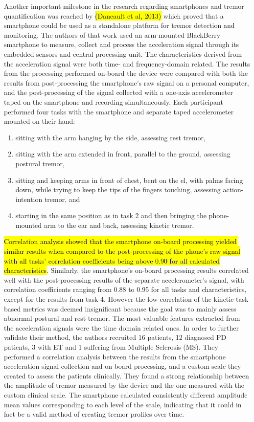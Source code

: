Another important milestone in the research regarding smartphones and tremor quantification was reached by \hl{(Daneault et al, 2013)} which proved that a smartphone could be used as a standalone platform for tremor detection and monitoring. The authors of that work used an arm-mounted BlackBerry smartphone to measure, collect and process the acceleration signal through its embedded sensors and central processing unit. The characteristics derived from the acceleration signal were both time- and frequency-domain related. The results from the processing performed on-board the device were compared with both the results from post-processing the smartphone's raw signal on a personal computer, and the post-processing of the signal collected with a one-axis accelerometer taped on the smartphone and recording simultaneously. Each participant performed four tasks with the smartphone and separate taped accelerometer mounted on their hand:

\begin{enumerate}
\item sitting with the arm hanging by the side, assessing rest tremor,
\item sitting with the arm extended in front, parallel to the ground, assessing postural tremor,
\item sitting and keeping arms in front of chest, bent on the el, with palms facing down, while trying to keep the tips of the fingers touching, assessing action-intention tremor, and 
\item starting in the same position as in task 2 and then bringing the phone-mounted arm to the ear and back, assessing kinetic tremor. 
\end{enumerate}

\hl{Correlation analysis showed that the smartphone on-board processing yielded similar results when compared to the post-processing of the phone's raw signal with all tasks' correlation coefficients being above 0.90 for all calculated characteristics}. Similarly, the smartphone's on-board processing results correlated well with the post-processing results of the separate accelerometer's signal, with correlation coefficients ranging from 0.88 to 0.95 for all tasks and characteristics, except for the results from task 4. However the low correlation of the kinetic task based metrics was deemed insignificant because the goal was to mainly assess abnormal postural and rest tremor. The most valuable features extracted from the acceleration signals were the time domain related ones. In order to further validate their method, the authors recruited 16 patients, 12 diagnosed \gls{PD} patients, 3 with \gls{ET} and 1 suffering from Multiple Sclerosis (\gls{MS}). They performed a correlation analysis between the results from the smartphone acceleration signal collection and on-board processing, and a custom scale they created to assess the patients clinically. They found a strong relationship between the amplitude of tremor measured by the device and the one measured with the custom clinical scale. The smartphone calculated consistently different amplitude mean values corresponding to each level of the scale, indicating that it could in fact be a valid method of creating tremor profiles over time. 

